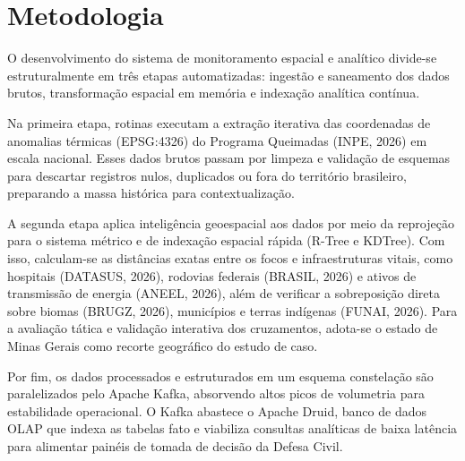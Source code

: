 \section*{Metodologia}

O desenvolvimento do sistema de monitoramento espacial e analítico divide-se estruturalmente em três etapas automatizadas: ingestão e saneamento dos dados brutos, transformação espacial em memória e indexação analítica contínua.

Na primeira etapa, rotinas executam a extração iterativa das coordenadas de anomalias térmicas (EPSG:4326) do Programa Queimadas (INPE, 2026) em escala nacional. Esses dados brutos passam por limpeza e validação de esquemas para descartar registros nulos, duplicados ou fora do território brasileiro, preparando a massa histórica para contextualização.

A segunda etapa aplica inteligência geoespacial aos dados por meio da reprojeção para o sistema métrico e de indexação espacial rápida (R-Tree e KDTree). Com isso, calculam-se as distâncias exatas entre os focos e infraestruturas vitais, como hospitais (DATASUS, 2026), rodovias federais (BRASIL, 2026) e ativos de transmissão de energia (ANEEL, 2026), além de verificar a sobreposição direta sobre biomas (BRUGZ, 2026), municípios e terras indígenas (FUNAI, 2026). Para a avaliação tática e validação interativa dos cruzamentos, adota-se o estado de Minas Gerais como recorte geográfico do estudo de caso.

Por fim, os dados processados e estruturados em um esquema constelação são paralelizados pelo Apache Kafka, absorvendo altos picos de volumetria para estabilidade operacional. O Kafka abastece o Apache Druid, banco de dados OLAP que indexa as tabelas fato e viabiliza consultas analíticas de baixa latência para alimentar painéis de tomada de decisão da Defesa Civil.
